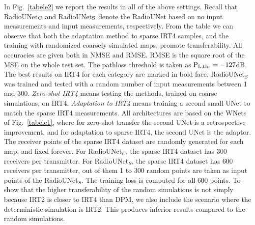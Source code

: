\documentclass[10pt,a4paper]{article}
\begin{document}
In Fig.~\ref{tabele2} we report the results in all of the above settings. Recall that RadioUNet$_{\rm C}$ and RadioUNet$_{\rm S}$ denote the RadioUNet based on no input measurements and input measurements, respectively.
From the table we can observe that both the adaptation method to sparse IRT4 samples, and the training with randomized coarsely simulated maps, promote transferability.
%
%
%
%
%
All accuracies are given both in NMSE and RMSE. 
     RMSE is the square root of the MSE on the whole test set.  
     The pathloss threshold is taken as $\textup{P}_{\textup{L,thr}} = -127$dB. %
     The best results on IRT4 for each category are marked in bold face.
     RadioUNet$_S$ was trained and tested with a random number of input measurements between 1 and 300.
     \emph{Zero-shot IRT4} means testing the methods, trained on coarse simulations, on IRT4. \emph{Adaptation to IRT4} means training a second small UNet to match the sparse IRT4 measurements. 
     All architectures are based on the WNets of Fig.~\ref{tabele1}, where for zero-shot transfer the second UNet is a retrospective improvement, and for adaptation to sparse IRT4, the second UNet is the adaptor.
     The receiver points of the sparse IRT4 dataset are randomly generated for each map, and fixed forever.
     For RadioUNet$_C$, the sparse IRT4 dataset has 300 receivers per transmitter. For RadioUNet$_S$, the sparse IRT4 dataset has 600 receivers per transmitter, out of them 1 to 300 random points are taken as input points of the RadioUNet$_S$. The training loss is computed for all 600 points. To show that the higher transferability of the random simulations is not simply because IRT2 is closer to IRT4 than DPM, we also include  the scenario where the deterministic simulation is IRT2. This produces inferior results compared to the random simulations.




%
\end{document}
